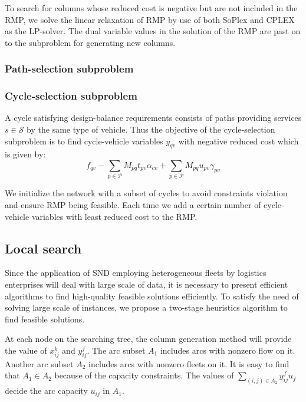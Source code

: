 \documentclass[11pt,nonblindrev,fleqn]{article}
\begin{document}
To search for columns whose reduced cost is negative but are not included in the RMP, we solve the linear relaxation of RMP by use of both SoPlex and CPLEX as the LP-solver. The dual variable values in the solution of the RMP are past on to the subproblem for generating new columns.
\subsubsection{Path-selection subproblem}

\subsubsection{Cycle-selection subproblem}
A cycle satisfying design-balance requirements consists of paths providing services $s\in \mathscr{S}$ by the same type of vehicle. Thus the objective of the cycle-selection subproblem is to find cycle-vehicle variables $y_{qv}$ with negative reduced cost which is given by:
\begin{equation}\label{cost}
f_{qv} - \sum_{p\in \mathscr{P}} M_{pq}t_{pv}\alpha_{cv} + \sum_{p\in \mathscr{P}} M_{pq}u_{pv}\gamma_{pv}
\end{equation}

We initialize the network with a subset of cycles to avoid constraints violation and ensure RMP being feasible. Each time we add a certain number of cycle-vehicle variables with least reduced cost to the RMP.

\subsection{Local search}
Since the application of SND employing heterogeneous fleets by logistics enterprises will deal with large scale of data, it is necessary to present efficient algorithms to find high-quality feasible solutions efficiently. To satisfy the need of solving large scale of instances, we propose a two-stage heuristics algorithm to find feasible solutions. 

At each node on the searching tree, the column generation method will provide the value of $x_{ij}^k$ and $y_{ij}^f$. The arc subset $A_1$ includes arcs with nonzero flow on it. Another arc subset $A_2$ includes arcs with nonzero fleets on it. It is easy to find that $A_1\in A_2$ because of the capacity constraints. The values of $\sum_{(i,j)\in A_2}y_{ij}^f u_f$ decide the arc capacity $u_{ij}$ in $A_1$.
\end{document}
